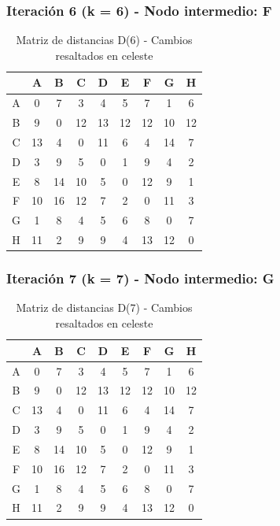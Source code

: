 \documentclass[12pt]{article}
\begin{document}
\subsubsection{Iteración 6 (k = 6) - Nodo intermedio: F}
\begin{table}[h!]
\centering
\begin{tabular}{|c|c|c|c|c|c|c|c|c|}
\hline
 & A & B & C & D & E & F & G & H \\\hline
A & 0 & 7 & 3 & 4 & 5 & 7 & 1 & 6 \\\hline
B & 9 & 0 & 12 & 13 & 12 & 12 & 10 & 12 \\\hline
C & 13 & 4 & 0 & \cellcolor{lightgreen} 11 & \cellcolor{lightgreen} 6 & 4 & 14 & \cellcolor{lightgreen} 7 \\\hline
D & 3 & 9 & 5 & 0 & 1 & 9 & 4 & 2 \\\hline
E & 8 & 14 & 10 & 5 & 0 & 12 & 9 & 1 \\\hline
F & 10 & 16 & 12 & 7 & 2 & 0 & 11 & 3 \\\hline
G & 1 & 8 & 4 & 5 & 6 & 8 & 0 & 7 \\\hline
H & 11 & 2 & 9 & 9 & 4 & 13 & 12 & 0 \\\hline
\end{tabular}
\caption{Matriz de distancias D(6) - Cambios resaltados en celeste}
\end{table}

\subsubsection{Iteración 7 (k = 7) - Nodo intermedio: G}
\begin{table}[h!]
\centering
\begin{tabular}{|c|c|c|c|c|c|c|c|c|}
\hline
 & A & B & C & D & E & F & G & H \\\hline
A & 0 & 7 & 3 & 4 & 5 & 7 & 1 & 6 \\\hline
B & 9 & 0 & 12 & 13 & 12 & 12 & 10 & 12 \\\hline
C & 13 & 4 & 0 & 11 & 6 & 4 & 14 & 7 \\\hline
D & 3 & 9 & 5 & 0 & 1 & 9 & 4 & 2 \\\hline
E & 8 & 14 & 10 & 5 & 0 & 12 & 9 & 1 \\\hline
F & 10 & 16 & 12 & 7 & 2 & 0 & 11 & 3 \\\hline
G & 1 & 8 & 4 & 5 & 6 & 8 & 0 & 7 \\\hline
H & 11 & 2 & 9 & 9 & 4 & 13 & 12 & 0 \\\hline
\end{tabular}
\caption{Matriz de distancias D(7) - Cambios resaltados en celeste}
\end{table}
\end{document}
